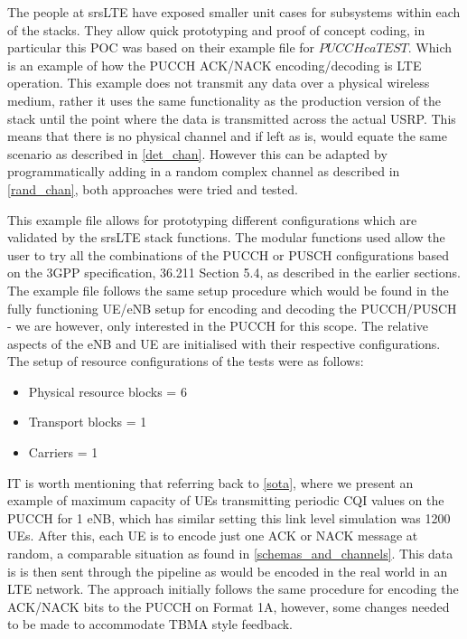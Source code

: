 \documentclass{article}
\begin{document}
The people at srsLTE have exposed smaller unit cases for subsystems within each of the stacks. They allow quick prototyping and proof of concept coding, in particular this POC was based on their example file for $PUCCH ca TEST$. Which is an example of how the PUCCH ACK/NACK encoding/decoding is LTE operation. This example does not transmit any data over a physical wireless medium, rather it uses the same functionality as the production version of the stack until the point where the data is transmitted across the actual USRP. This means that there is no physical channel and if left as is, would equate the same scenario as described in \cref{det_chan}. However this can be adapted by programmatically adding in a random complex channel as described in \cref{rand_chan}, both approaches were tried and tested. 

This example file allows for prototyping different configurations which are validated by the srsLTE stack functions. The modular functions used allow the user to try all the combinations of the PUCCH or PUSCH configurations based on the 3GPP specification, 36.211 Section 5.4, as described in the earlier sections. The example file follows the same setup procedure which would be found in the fully functioning UE/eNB setup for encoding and decoding the PUCCH/PUSCH - we are however, only interested in the PUCCH for this scope. The relative aspects of the eNB and UE are initialised with their respective configurations. The setup of resource configurations of the tests were as follows:

\begin{itemize}
    \item Physical resource blocks = 6
    \item Transport blocks = 1
    \item Carriers = 1
\end{itemize}


IT is worth mentioning that referring back to \cref{sota}, where we present an example of maximum capacity of UEs transmitting periodic CQI values on the \ac{PUCCH} for 1 \ac{eNB}, which has similar setting this link level simulation was 1200 UEs. 
After this, each UE is to encode just one ACK or NACK message at random, a comparable situation as found in \cref{schemas_and_channels}. This data is is then sent through the pipeline as would be encoded in the real world in an LTE network. The approach initially follows the same procedure for encoding the ACK/NACK bits to the PUCCH on Format 1A, however, some changes needed to be made to accommodate TBMA style feedback.
\end{document}
